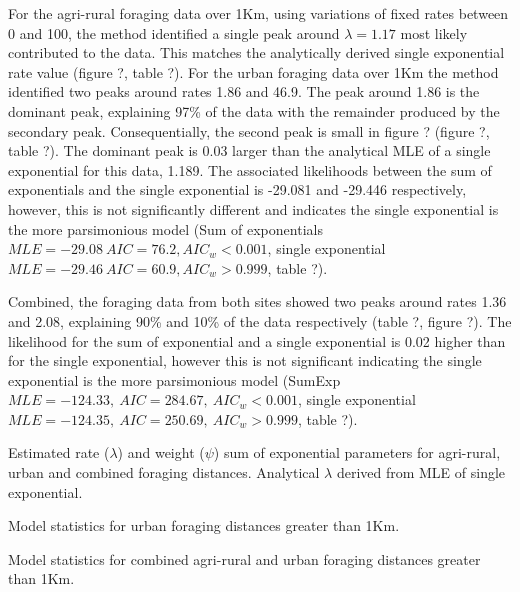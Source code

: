 \documentclass[11pt,usenames,dvipsnames,a4paper]{article}
\begin{document}
\begin{linenumbers}
\hspace{\parindent}
For the agri-rural foraging data over 1Km, using variations of fixed rates between 0 and 100, the method identified a single peak around $\lambda = 1.17$ most likely contributed to the data. This matches the analytically derived single exponential rate value (figure ?, table ?). For the urban foraging data over 1Km the method identified two peaks around rates 1.86 and 46.9. The peak around 1.86 is the dominant peak, explaining 97\% of the data with the remainder produced by the secondary peak. Consequentially, the second peak is small in figure ? (figure ?, table ?). The dominant peak is 0.03 larger than the analytical MLE of a single exponential for this data, 1.189. The associated likelihoods between the sum of exponentials and the single exponential is -29.081 and -29.446 respectively, however, this is not significantly different and indicates the single exponential is the more parsimonious model (Sum of exponentials $MLE = -29.08\ AIC = 76.2, AIC_w < 0.001$, single exponential $MLE = -29.46\ AIC = 60.9, AIC_w > 0.999$, table ?). 

Combined, the foraging data from both sites showed two peaks around rates 1.36 and 2.08, explaining 90\% and 10\% of the data respectively (table ?, figure ?). The likelihood for the sum of exponential and a single exponential is 0.02 higher than for the single exponential, however this is not significant indicating the single exponential is the more parsimonious model (SumExp $MLE = -124.33,\ AIC = 284.67,\ AIC_w < 0.001$, single exponential $MLE = -124.35,\ AIC = 250.69,\ AIC_w > 0.999$, table ?).
\end{linenumbers}

\begin{table}[H]
	\centering
	\caption{Estimated rate ($\lambda$) and weight ($\psi$) sum of exponential parameters for agri-rural, urban and combined foraging distances. Analytical $\lambda$ derived from MLE of single exponential.}
	
\end{table}

\begin{table}[H]
	\centering
	\caption{Model statistics for urban foraging distances greater than 1Km.}
	
\end{table}

\begin{table}[H]
	\centering
	\caption{Model statistics for combined agri-rural and urban foraging distances greater than 1Km.}
	
\end{table}
\end{document}
